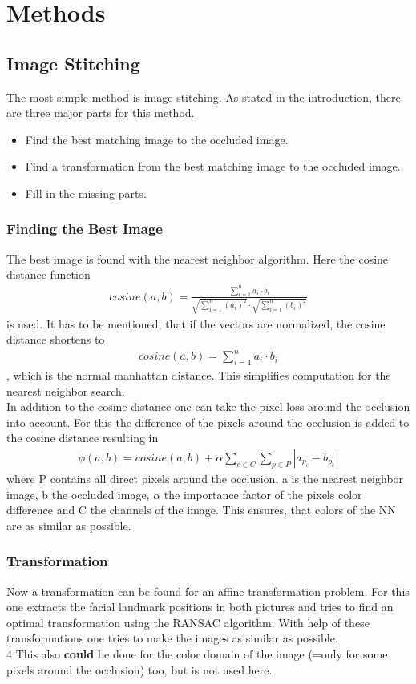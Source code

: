 \documentclass[
     11pt,         %
     a4paper,      %
     oneside,
     ]{article}
\begin{document}
\section{Methods}
\subsection{Image Stitching}
The most simple method is image stitching. As stated in the introduction, there are three major parts for this method.
\begin{itemize}
  \item Find the best matching image to the occluded image.
  \item Find a transformation from the best matching image to the occluded image.
  \item Fill in the missing parts.
\end{itemize}
\subsubsection{Finding the Best Image}
The best image is found with the nearest neighbor algorithm. Here the cosine distance function
\begin{align*}
  cosine(a,b) = \frac{\sum^n_{i=1} a_i \cdot b_i}{ \sqrt{\sum^n_{i=1} (a_i)^2} \cdot \sqrt{\sum^n_{i=1} (b_i)^2} }
\end{align*}
is used. It has to be mentioned, that if the vectors are normalized, the cosine distance shortens to
\begin{align*}
  cosine(a,b) = \sum^n_{i=1} a_i \cdot b_i
\end{align*}
, which is the normal manhattan distance. This simplifies computation for the nearest neighbor search. \\
In addition to the cosine distance one can take the pixel loss around the occlusion into account. For this the difference of the pixels around the occlusion is added to the cosine distance resulting in
\begin{align*}
  \phi(a,b)=cosine(a,b)+ \alpha \sum_{c \in C} \sum_{p \in P} |a_{p_c}-b_{p_c}|
\end{align*}
where P contains all direct pixels around the occlusion, a is the nearest neighbor image, b the occluded image, $\alpha$ the importance factor of the pixels color difference and C the channels of the image. This ensures, that colors of the NN are as similar as possible.

\subsubsection{Transformation}
Now a transformation can be found for an affine transformation problem. For this one extracts the facial landmark positions in both pictures and tries to find an optimal transformation using the RANSAC algorithm. With help of these transformations one tries to make the images as similar as possible.\\4
This also \textbf{could} be done for the color domain of the image (=only for some pixels around the occlusion) too, but is not used here.
\end{document}
